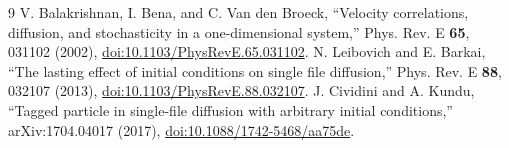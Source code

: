 \documentclass[11pt,a4paper]{article}
\begin{document}
\begin{thebibliography}{9}
V. Balakrishnan, I. Bena, and C. Van den Broeck,
``Velocity correlations, diffusion, and stochasticity in a one-dimensional
system,'' Phys. Rev. E \textbf{65}, 031102 (2002),
\href{https://doi.org/10.1103/PhysRevE.65.031102}{doi:10.1103/PhysRevE.65.031102}.
N. Leibovich and E. Barkai,
``The lasting effect of initial conditions on single file diffusion,''
Phys. Rev. E \textbf{88}, 032107 (2013),
\href{https://doi.org/10.1103/PhysRevE.88.032107}{doi:10.1103/PhysRevE.88.032107}.
J. Cividini and A. Kundu,
``Tagged particle in single-file diffusion with arbitrary initial conditions,''
arXiv:1704.04017 (2017),
\href{https://doi.org/10.1088/1742-5468/aa75de}{doi:10.1088/1742-5468/aa75de}.
\end{thebibliography}
\end{document}

